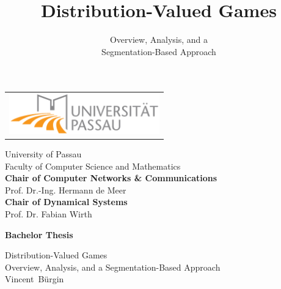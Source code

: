 \documentclass[a4paper,DIV=11,abstracton,twoside=semi]{scrreprt}
\title{\huge Distribution-Valued Games}
\subtitle{\LARGE Overview, Analysis, and a \\Segmentation-Based Approach}
\theoremstyle{definition}
\begin{document}
    \begin{titlepage}
        \newcommand{\authornamefirst}{Vincent}
        \newcommand{\authornamelast}{Bürgin}
        \newcommand{\worktitle}{Distribution-Valued Games}
        \newcommand{\worksubtitle}{Overview, Analysis, and a Segmentation-Based Approach}
        \newcommand{\thesistype}{Bachelor Thesis}
        \newcommand{\thesisdate}{September 25, 2020}
        \newcommand{\thesisprofDeMeer}{Prof. Dr.-Ing. Hermann de Meer}
        \newcommand{\thesisprofWirth}{Prof. Dr. Fabian Wirth}
        \newcommand{\supervisor}{Ali Alshawish,~M.~Sc.}
        \newcommand{\chairDeMeer}{Chair of Computer Networks \& Communications}
        \newcommand{\chairWirth}{Chair of Dynamical Systems}
        \vspace{1cm}
        
        \begin{center}
            \begin{tabular}{c}
                \includegraphics[width=6.5cm]{Pictures/logouni.pdf}
            \end{tabular}
            
            \vspace{3cm}
            \Large University of Passau \\
            \Large Faculty of Computer Science and Mathematics \\
            \vspace{0.3cm}
            {\Large \textbf{\chairDeMeer} } \\
            {\large \thesisprofDeMeer } \\[0.4cm]
            {\Large \textbf{\chairWirth} } \\
            {\large \thesisprofWirth}
        \end{center}
        
        \vspace{2.5cm}        
        \begin{center}
            {\textbf{\huge \thesistype}} %
        \end{center}
        
        \begin{center}
            {
                \LARGE \worktitle \\[0.25cm]
                \Large \worksubtitle
            }  \\[0.8cm]
            {\Large
                \authornamefirst~\authornamelast
            }
        \end{center}
        

\end{titlepage}
\end{document}
